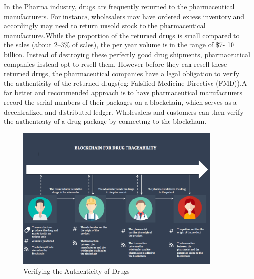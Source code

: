 \documentclass[12pt]{report}
\begin{document}
In the Pharma industry, drugs are frequently returned to the pharmaceutical manufacturers. For instance, wholesalers may have ordered excess inventory and accordingly may need to return unsold stock to the pharmaceutical manufactures.While the proportion of the returned drugs is small compared to the sales (about 2–3\% of sales), the per year volume is in the range of \$7- 10 billion.\cite{14}
Instead of destroying these perfectly good drug shipments, pharmaceutical companies instead opt to resell them. However before they can resell these returned drugs, the pharmaceutical companies have a legal obligation to verify the authenticity of the returned drugs(eg: Falsified Medicine Directive (FMD)).A far better and recommended approach is to have pharmaceutical manufacturers record the serial numbers of their packages on a blockchain, which serves as a decentralized and distributed ledger. Wholesalers and customers can then verify the authenticity of a drug package by connecting to the blockchain.
\begin{figure}[H]
\centering
\includegraphics[width=0.9\textwidth]{drug.png}
\caption{ Verifying the Authenticity of Drugs}
\label{drug}
\end{figure}
\end{document}

